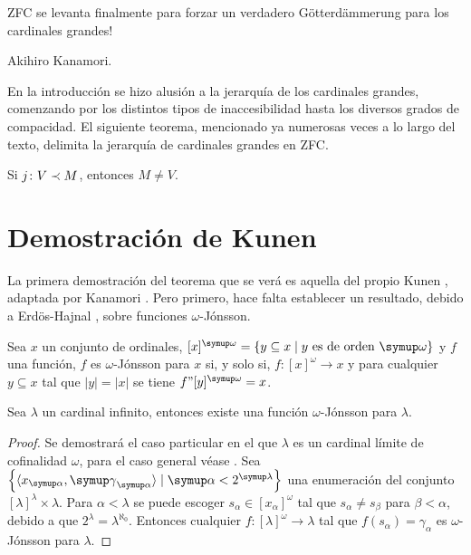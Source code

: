 \epigraph
{
    ZFC se levanta finalmente para forzar
    un verdadero Götterdämmerung para los cardinales
    grandes!
}
{Akihiro Kanamori. \autocite[324]{kanamori_higher_2009}}


En la introducción se hizo alusión a la jerarquía de los cardinales grandes,
comenzando por los distintos tipos de inaccesibilidad hasta los diversos
grados de compacidad. El siguiente teorema, mencionado ya numerosas veces a lo largo
del texto, delimita la jerarquía de cardinales grandes en ZFC.

\begin{teo}[Kunen]\label{teo:kunen}
    Si $j\colon V\prec M$, entonces $M\neq V$.
\end{teo}

\section{Demostración de Kunen}

La primera demostración del teorema que se verá es aquella
del propio Kunen \autocite{kunen_elementary_1971}, adaptada
por Kanamori \autocite{kanamori_higher_2009}. Pero primero,
hace falta establecer un resultado, debido a Erdös-Hajnal \autocite{erdos_problem_1966},
sobre funciones $\omega$-Jónsson.

\begin{defi}
    Sea $x$ un conjunto de ordinales, $[x]^\omega = \set{y\subseteq x\mid \text{$y$ es de orden $\omega$}}$
    y $f$ una función,
    $f$ es $\omega$-Jónsson para $x$ si, y solo si,
    $f\colon [x]^\omega\to x$ y para cualquier $y\subseteq x$
    tal que $|y|=|x|$ se tiene $f"[y]^\omega = x$.
\end{defi}

\begin{teo}\label{teo:jonsson}
    Sea $\lambda$ un cardinal infinito, entonces existe una función $\omega$-Jónsson para $\lambda$.
\end{teo}

\begin{proof}
    Se demostrará el caso particular en el que $\lambda$ es un cardinal límite de cofinalidad $\omega$,
    para el caso general véase \autocite[Teorema 23.13]{kanamori_higher_2009}.
    Sea $\set{\op{x_\alpha,\gamma_\alpha}\mid \alpha < 2^\lambda}$ una enumeración del conjunto $[\lambda]^\lambda\times\lambda$.
    Para $\alpha<\lambda$ se puede escoger $s_\alpha\in[x_\alpha]^\omega$ tal que $s_\alpha\neq s_\beta$ para $\beta<\alpha$,
    debido a que $2^\lambda=\lambda^{\aleph_0}$. Entonces cualquier $f\colon[\lambda]^\omega\to\lambda$
    tal que $f(s_\alpha)=\gamma_\alpha$ es $\omega$-Jónsson para $\lambda$.
\end{proof}


